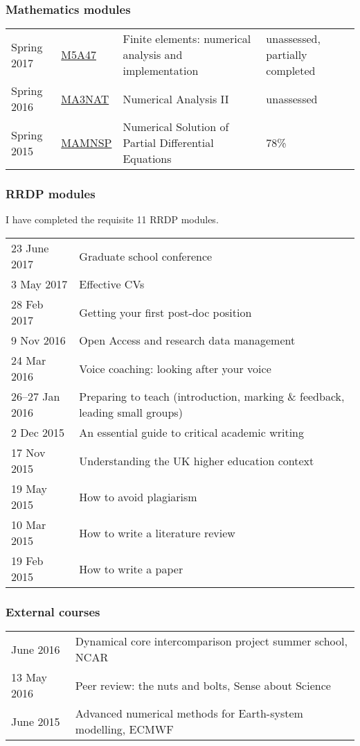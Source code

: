 \documentclass[a4paper,11pt]{article}
\begin{document}
\subsubsection*{Mathematics modules}
\begin{tabular}{l l l l}
Spring 2017	& \href{https://finite-element.github.io}{M5A47}  & Finite elements: numerical analysis and implementation & unassessed, partially completed \\
Spring 2016	& \href{www.reading.ac.uk/module/document.aspx?modP=MA3NAT&modYR=1516}{MA3NAT} & Numerical Analysis II & unassessed \\
Spring 2015	& \href{www.reading.ac.uk/modules/document.aspx?modP=MAMNSP&modYR=1415}{MAMNSP} & Numerical Solution of Partial Differential Equations  & 78\% \\
\end{tabular}

\subsubsection*{RRDP modules}
I have completed the requisite 11 RRDP modules.

\vspace*{0.5em}
\begin{tabular}{l l}
23 June 2017    & Graduate school conference \\
3 May 2017	& Effective CVs \\
28 Feb 2017	& Getting your first post-doc position \\
9 Nov 2016      & Open Access and research data management \\
24 Mar 2016	& Voice coaching: looking after your voice \\
26--27 Jan 2016 & Preparing to teach (introduction, marking \& feedback, leading small groups) \\
2 Dec 2015	& An essential guide to critical academic writing \\
17 Nov 2015	& Understanding the UK higher education context \\
19 May 2015	& How to avoid plagiarism \\
10 Mar 2015	& How to write a literature review \\
19 Feb 2015	& How to write a paper \\
\end{tabular}

\subsubsection*{External courses}
\begin{tabular}{l l}
June 2016 & Dynamical core intercomparison project summer school, NCAR \\
13 May 2016 & Peer review: the nuts and bolts, Sense about Science \\
June 2015 & Advanced numerical methods for Earth-system modelling, ECMWF \\
\end{tabular}
\end{document}
